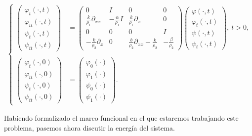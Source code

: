 \begin{align}
    \label{probCauchyHomTimoDosAmortigDesglosado}
    \begin{cases}
        \begin{pmatrix}
            \varphi_{t}(\cdot, t)\\
            \varphi_{tt}(\cdot, t)\\
            \psi_{t}(\cdot, t)\\
            \psi_{tt}(\cdot, t)
        \end{pmatrix} &= 
        \begin{pmatrix}
        0 & I & 0 & 0\\
        \frac{k}{\rho_1}\partial_{xx} & -\frac{\alpha}{\rho_1}I & \frac{k}{\rho_1}\partial_x & 0\\
        0 & 0 & 0 & I\\
        -\frac{k}{\rho_2}\partial_x & 0 & \frac{b}{\rho_2}\partial_{xx} - \frac{k}{\rho_2} & -\frac{\beta}{\rho_2}
        \end{pmatrix}
        \begin{pmatrix}
            \varphi(\cdot, t)\\
            \varphi_{t}(\cdot, t)\\
            \psi(\cdot, t)\\
            \psi_{t}(\cdot, t)
        \end{pmatrix}, \ t > 0,\\ \\
        \begin{pmatrix}
            \varphi_{t}(\cdot, 0)\\
            \varphi_{tt}(\cdot, 0)\\
            \psi_{t}(\cdot, 0)\\
            \psi_{tt}(\cdot, 0)
        \end{pmatrix} &=
        \begin{pmatrix}
            \varphi_0(\cdot)\\
            \varphi_1(\cdot)\\
            \psi_0(\cdot)\\
            \psi_1(\cdot)
        \end{pmatrix}.
    \end{cases}
\end{align}

Habiendo formalizado el marco funcional en el que estaremos trabajando este problema, pasemos ahora discutir la energía del sistema.

